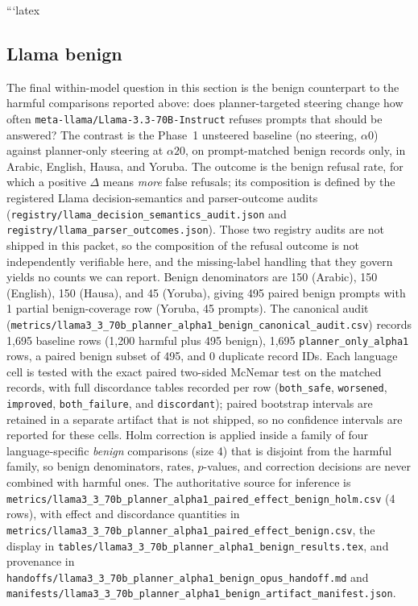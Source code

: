 ```latex
\subsection{Llama benign}

The final within-model question in this section is the benign counterpart to the
harmful comparisons reported above: does planner-targeted steering change how
often \texttt{meta-llama/Llama-3.3-70B-Instruct} refuses prompts that should be
answered? The contrast is the Phase~1 unsteered baseline (no steering,
$\alpha0$) against planner-only steering at $\alpha20$, on prompt-matched benign
records only, in Arabic, English, Hausa, and Yoruba. The outcome is the benign
refusal rate, for which a positive $\Delta$ means \emph{more} false refusals;
its composition is defined by the registered Llama decision-semantics and
parser-outcome audits
(\texttt{registry/llama\_decision\_semantics\_audit.json} and
\texttt{registry/llama\_parser\_outcomes.json}). Those two registry audits are
not shipped in this packet, so the composition of the refusal outcome is not
independently verifiable here, and the missing-label handling that they govern
yields no counts we can report. Benign denominators are 150 (Arabic), 150
(English), 150 (Hausa), and 45 (Yoruba), giving 495 paired benign prompts with 1
partial benign-coverage row (Yoruba, 45 prompts). The canonical audit
(\texttt{metrics/llama3\_3\_70b\_planner\_alpha1\_benign\_canonical\_audit.csv})
records 1{,}695 baseline rows (1{,}200 harmful plus 495 benign), 1{,}695
\texttt{planner\_only\_alpha1} rows, a paired benign subset of 495, and 0
duplicate record IDs. Each language cell is tested with the exact paired
two-sided McNemar test on the matched records, with full discordance tables
recorded per row (\texttt{both\_safe}, \texttt{worsened}, \texttt{improved},
\texttt{both\_failure}, and \texttt{discordant}); paired bootstrap intervals are
retained in a separate artifact that is not shipped, so no confidence intervals
are reported for these cells. Holm correction is applied inside a family of four
language-specific \emph{benign} comparisons (size 4) that is disjoint from the
harmful family, so benign denominators, rates, $p$-values, and correction
decisions are never combined with harmful ones. The authoritative source for
inference is
\texttt{metrics/llama3\_3\_70b\_planner\_alpha1\_paired\_effect\_benign\_holm.csv}
(4 rows), with effect and discordance quantities in
\texttt{metrics/llama3\_3\_70b\_planner\_alpha1\_paired\_effect\_benign.csv},
the display in
\texttt{tables/llama3\_3\_70b\_planner\_alpha1\_benign\_results.tex}, and
provenance in
\texttt{handoffs/llama3\_3\_70b\_planner\_alpha1\_benign\_opus\_handoff.md} and
\texttt{manifests/llama3\_3\_70b\_planner\_alpha1\_benign\_artifact\_manifest.json}.

